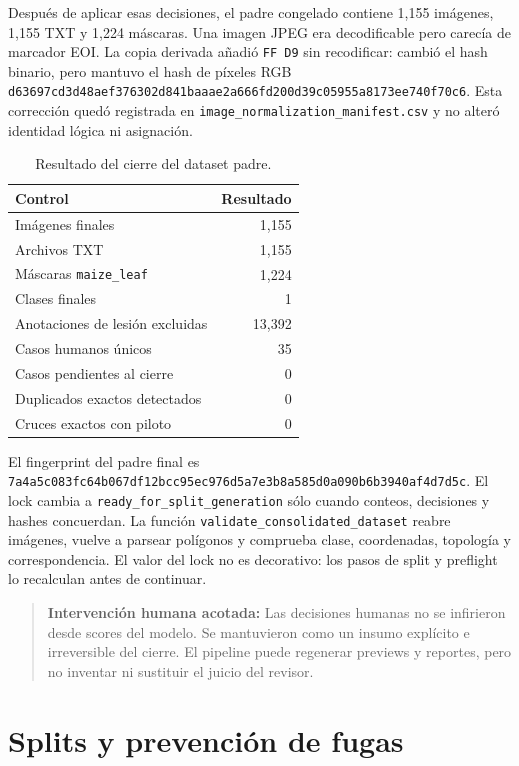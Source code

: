 \documentclass[11pt,a4paper]{article}
\begin{document}
Después de aplicar esas decisiones, el padre congelado contiene 1,155 imágenes, 1,155 TXT y 1,224 máscaras. Una imagen JPEG era decodificable pero carecía de marcador EOI. La copia derivada añadió \texttt{FF D9} sin recodificar: cambió el hash binario, pero mantuvo el hash de píxeles RGB \texttt{d63697cd3d48aef376302d841baaae2a666fd200d39c05955a8173ee740f70c6}. Esta corrección quedó registrada en \texttt{image\_normalization\_manifest.csv} y no alteró identidad lógica ni asignación.


\begin{table}[H]
\centering
\caption{Resultado del cierre del dataset padre.}
\small
\begin{tabular}{lr}
\toprule
Control & Resultado \\
\midrule
Imágenes finales & 1,155 \\
Archivos TXT & 1,155 \\
Máscaras \texttt{maize\_leaf} & 1,224 \\
Clases finales & 1 \\
Anotaciones de lesión excluidas & 13,392 \\
Casos humanos únicos & 35 \\
Casos pendientes al cierre & 0 \\
Duplicados exactos detectados & 0 \\
Cruces exactos con piloto & 0 \\
\bottomrule
\end{tabular}
\end{table}

El fingerprint del padre final es \texttt{7a4a5c083fc64b067df12bcc95ec976d5a7e3b8a585d0a090b6b3940af4d7d5c}. El lock cambia a \texttt{ready\_for\_split\_generation} sólo cuando conteos, decisiones y hashes concuerdan. La función \texttt{validate\_consolidated\_dataset} reabre imágenes, vuelve a parsear polígonos y comprueba clase, coordenadas, topología y correspondencia. El valor del lock no es decorativo: los pasos de split y preflight lo recalculan antes de continuar.


\begin{quote}\textbf{Intervención humana acotada:} Las decisiones humanas no se infirieron desde scores del modelo. Se mantuvieron como un insumo explícito e irreversible del cierre. El pipeline puede regenerar previews y reportes, pero no inventar ni sustituir el juicio del revisor.\end{quote}

\section{Splits y prevención de fugas}
\end{document}
